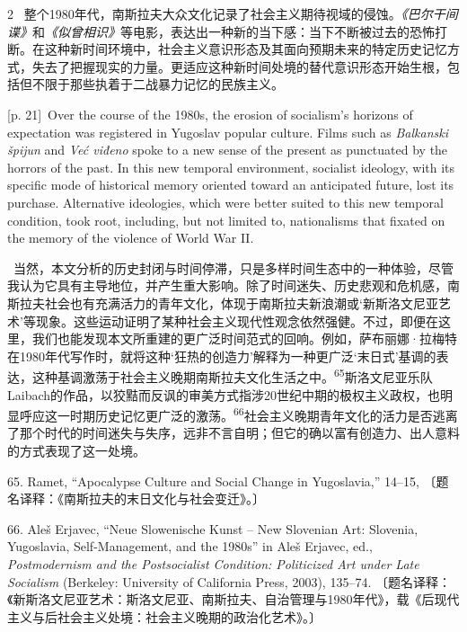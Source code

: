 \documentclass[10pt,a4paper]{article}
\begin{document}
\begin{paracol}{2}
\switchcolumn*
{\scriptsize\color{gray} [p. 21]}\ 整个1980年代，南斯拉夫大众文化记录了社会主义期待视域的侵蚀。\textit{《巴尔干间谍》}和\textit{《似曾相识》}等电影，表达出一种新的当下感：当下不断被过去的恐怖打断。在这种新时间环境中，社会主义意识形态及其面向预期未来的特定历史记忆方式，失去了把握现实的力量。更适应这种新时间处境的替代意识形态开始生根，包括但不限于那些执着于二战暴力记忆的民族主义。\par
\switchcolumn
{\scriptsize\color{gray} [p. 21]}\ Over the course of the 1980s, the erosion of socialism’s horizons of expectation was registered in Yugoslav popular culture. Films such as \textit{Balkanski špijun} and \textit{Već viđeno} spoke to a new sense of the present as punctuated by the horrors of the past. In this new temporal environment, socialist ideology, with its specific mode of historical memory oriented toward an anticipated future, lost its purchase. Alternative ideologies, which were better suited to this new temporal condition, took root, including, but not limited to, nationalisms that fixated on the memory of the violence of World War II.\par
\switchcolumn*
{\scriptsize\color{gray} [p. 21]}\ 当然，本文分析的历史封闭与时间停滞，只是多样时间生态中的一种体验，尽管我认为它具有主导地位，并产生重大影响。除了时间迷失、历史悲观和危机感，南斯拉夫社会也有充满活力的青年文化，体现于南斯拉夫新浪潮或‘新斯洛文尼亚艺术’等现象。这些运动证明了某种社会主义现代性观念依然强健。不过，即便在这里，我们也能发现本文所重建的更广泛时间范式的回响。例如，萨布丽娜·拉梅特在1980年代写作时，就将这种‘狂热的创造力’解释为一种更广泛‘末日式’基调的表达，这种基调激荡于社会主义晚期南斯拉夫文化生活之\mbox{中。\textsuperscript{65}}斯洛文尼亚乐队Laibach的作品，以狡黠而反讽的审美方式指涉20世纪中期的极权主义政权，也明显呼应这一时期历史记忆更广泛的激\mbox{荡。\textsuperscript{66}}社会主义晚期青年文化的活力是否逃离了那个时代的时间迷失与失序，远非不言自明；但它的确以富有创造力、出人意料的方式表现了这一处境。\par{\small 65. Ramet, “Apocalypse Culture and Social Change in Yugoslavia,” 14–15, 〔题名译释：《南斯拉夫的末日文化与社会变迁》。〕\par}{\small 66. Aleš Erjavec, “Neue Slowenische Kunst – New Slovenian Art: Slovenia, Yugoslavia, Self-Management, and the 1980s” in Aleš Erjavec, ed., \textit{Postmodernism and the Postsocialist Condition: Politicized Art under Late Socialism} (Berkeley: University of California Press, 2003), 135–74. 〔题名译释：《新斯洛文尼亚艺术：斯洛文尼亚、南斯拉夫、自治管理与1980年代》，载《后现代主义与后社会主义处境：社会主义晚期的政治化艺术》。〕\par}

\end{paracol}
\end{document}
